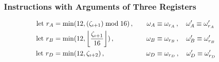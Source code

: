 \subsubsection{Instructions with Arguments of Three Registers}
\begin{equation}
\begin{aligned}
  \using r_A &= \min(12, (\instructions_{\imath+1}) \bmod 16) \,,\quad&
  \reg_A &\equiv \reg_{r_A} \,,\quad
  \reg'_A \equiv \reg'_{r_A} \\
  \using r_B &= \min(12, \ffrac{\instructions_{\imath+1}}{16}) \,,\quad&
  \reg_B &\equiv \reg_{r_B} \,,\quad
  \reg'_B \equiv \reg'_{r_B} \\
  \using r_D &= \min(12, \instructions_{\imath+2}) \,,\quad&
  \reg_D &\equiv \reg_{r_D} \,,\quad
  \reg'_D \equiv \reg'_{r_D} \\
\end{aligned}
\end{equation}

